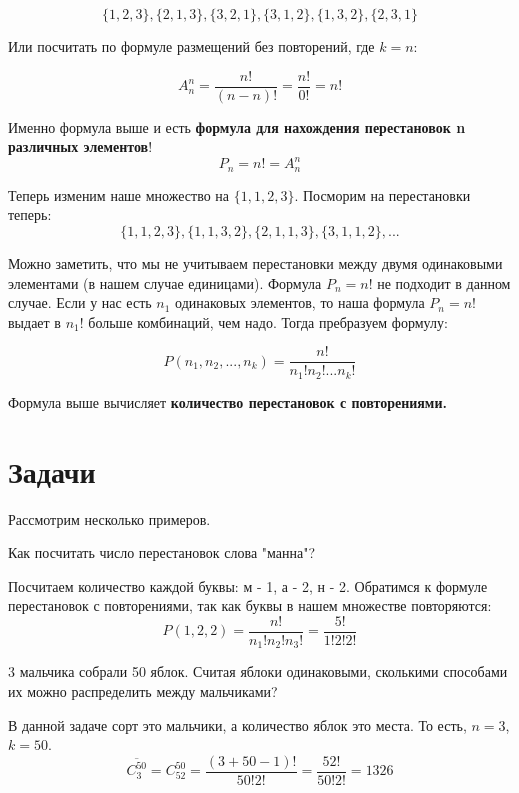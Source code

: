 \begin{equation*}
    \{1, 2, 3\}, \{2, 1, 3\}, \{3, 2, 1\}, \{3, 1, 2\}, \{1, 3, 2\}, \{2, 3, 1\}
\end{equation*}

Или посчитать по формуле размещений без повторений, где $k = n$:

\begin{equation*}
    A_{n}^n = \frac{n!}{(n-n)!} = \frac{n!}{0!} = n!
\end{equation*}

Именно формула выше и есть \textbf{формула для нахождения перестановок n различных элементов}!
\begin{equation}
    P_n = n! = A_{n}^n
\end{equation}

Теперь изменим наше множество на $\{1, 1, 2, 3\}$. Посморим на перестановки теперь:
\begin{equation*}
    \{1, 1, 2, 3\}, \{1, 1, 3, 2\}, \{2, 1, 1, 3\}, \{3, 1, 1, 2\}, ... 
\end{equation*}

Можно заметить, что мы не учитываем перестановки между двумя одинаковыми элементами (в нашем случае единицами).
Формула $P_n = n!$ не подходит в данном случае. Если у нас есть $n_1$ одинаковых элементов,
то наша формула $P_n = n!$ выдает в $n_1!$ больше комбинаций, чем надо. Тогда пребразуем формулу:

\begin{equation}
    P(n_1, n_2, ..., n_k) = \frac{n!}{n_1!n_2!...n_k!}
\end{equation}

Формула выше вычисляет \textbf{количество перестановок с повторениями.}
\section{Задачи}
Рассмотрим несколько примеров.
\begin{task}
    Как посчитать число перестановок слова "манна"?
    \begin{solution}
        Посчитаем количество каждой буквы: м - 1, а - 2, н - 2. Обратимся к формуле
        перестановок с повторениями, так как буквы в нашем множестве повторяются:
        \begin{equation*}
            P(1, 2, 2) = \frac{n!}{n_1!n_2!n_3!} = \frac{5!}{1!2!2!}
        \end{equation*}
    \end{solution}
\end{task}
\begin{task}
    3 мальчика собрали 50 яблок. Считая яблоки одинаковыми, сколькими способами
    их можно распределить между мальчиками?
    \begin{solution}
        В данной задаче сорт это мальчики, а количество яблок это места. То есть, $n = 3$, $k = 50$.
        \begin{equation*}
            \overline {C^{50}_3} = C^{50}_{52} = \frac{(3+50-1)!}{50!2!} = \frac{52!}{50!2!} = 1326
        \end{equation*}
    \end{solution}
\end{task}

